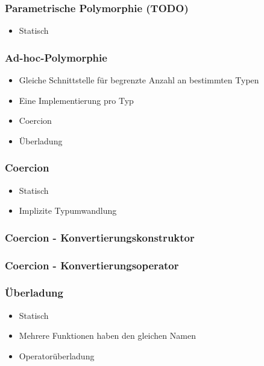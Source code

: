 \begin{frame}
	\frametitle{Parametrische Polymorphie (TODO)}
	\begin{itemize}
		\item Statisch
	\end{itemize}
\end{frame}


\begin{frame}
	\frametitle{Ad-hoc-Polymorphie}
	\begin{itemize}
		\item Gleiche Schnittstelle für begrenzte Anzahl an bestimmten Typen
		\item Eine Implementierung pro Typ
		\item Coercion
		\item Überladung
	\end{itemize}
\end{frame}


\begin{frame}
	\frametitle{Coercion}
	\begin{itemize}
		\item Statisch
		\item Implizite Typumwandlung
	\end{itemize}
	{\tiny\UseRawInputEncoding{}}
\end{frame}

\begin{frame}
	\frametitle{Coercion - Konvertierungskonstruktor}
	{\tiny\UseRawInputEncoding{}}
\end{frame}

\begin{frame}
	\frametitle{Coercion - Konvertierungsoperator}
	{\tiny\UseRawInputEncoding{}}
\end{frame}


\begin{frame}
	\frametitle{Überladung}
	\begin{itemize}
		\item Statisch
		\item Mehrere Funktionen haben den gleichen Namen
		\item Operatorüberladung
	\end{itemize}
	{\tiny\UseRawInputEncoding{}}
\end{frame}
